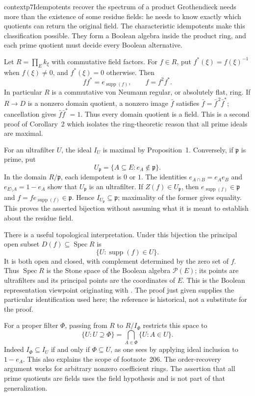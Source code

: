 \begin{dcomment}{context}{p7}{Idempotents recover the spectrum of a product}
Grothendieck needs more than the existence of some residue fields: he needs to know exactly which quotients can return the original field. The characteristic idempotents make this classification possible. They form a Boolean algebra inside the product ring, and each prime quotient must decide every Boolean alternative.

Let $R=\prod_E k_\xi$ with commutative field factors. For $f\in R$, put $f^*(\xi)=f(\xi)^{-1}$ when $f(\xi)\ne0$, and $f^*(\xi)=0$ otherwise. Then
\[
 ff^*=e_{\operatorname{supp}(f)},
 \qquad f=f^2f^*.
\]
In particular $R$ is a commutative von Neumann regular, or absolutely flat, ring. If $R\to D$ is a nonzero domain quotient, a nonzero image $\bar f$ satisfies $\bar f=\bar f^{\,2}\bar f^*$; cancellation gives $\bar f\bar f^*=1$. Thus every domain quotient is a field. This is a second proof of Corollary~2 which isolates the ring-theoretic reason that all prime ideals are maximal.

For an ultrafilter $U$, the ideal $I_U$ is maximal by Proposition~1. Conversely, if $\mathfrak p$ is prime, put
\[
 U_{\mathfrak p}=\{A\subseteq E:e_A\notin\mathfrak p\}.
\]
In the domain $R/\mathfrak p$, each idempotent is $0$ or $1$. The identities $e_{A\cap B}=e_Ae_B$ and $e_{E\setminus A}=1-e_A$ show that $U_{\mathfrak p}$ is an ultrafilter. If $Z(f)\in U_{\mathfrak p}$, then $e_{\operatorname{supp}(f)}\in\mathfrak p$ and $f=fe_{\operatorname{supp}(f)}\in\mathfrak p$. Hence $I_{U_{\mathfrak p}}\subseteq\mathfrak p$; maximality of the former gives equality. This proves the asserted bijection without assuming what it is meant to establish about the residue field.

There is a useful topological interpretation. Under this bijection the principal open subset $D(f)\subseteq\operatorname{Spec}R$ is
\[
 \{U:\operatorname{supp}(f)\in U\}.
\]
It is both open and closed, with complement determined by the zero set of $f$. Thus $\operatorname{Spec}R$ is the Stone space of the Boolean algebra $\mathcal P(E)$; its points are ultrafilters and its principal points are the coordinates of $E$. This is the Boolean representation viewpoint originating with \citet{Stone1936Boolean}. The proof just given supplies the particular identification used here; the reference is historical, not a substitute for the proof.

For a proper filter $\Phi$, passing from $R$ to $R/I_\Phi$ restricts this space to
\[
 \{U:U\supseteq\Phi\}
   =\bigcap_{A\in\Phi}\{U:A\in U\}.
\]
Indeed $I_\Phi\subseteq I_U$ if and only if $\Phi\subseteq U$, as one sees by applying ideal inclusion to $1-e_A$. This also explains the scope of footnote~206. The order-recovery argument works for arbitrary nonzero coefficient rings. The assertion that all prime quotients are fields uses the field hypothesis and is not part of that generalization.
\end{dcomment}


